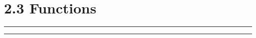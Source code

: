 \documentclass[a4paper, 12pt]{article}
\theoremstyle{plain}
\begin{document}
\section*{2.3 Functions}
\begin{center}
    \rule{5.4in}{1pt}
\end{center}




\begin{center}
    \rule{5.4in}{1pt}
\end{center}
\end{document}

